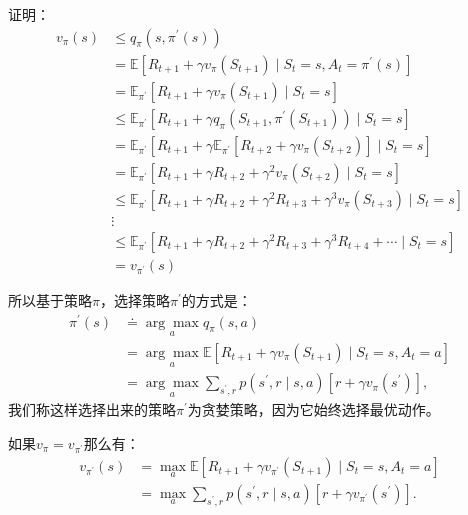 证明：
$$
\begin{aligned}
v_{\pi}(s) & \leq q_{\pi}\left(s, \pi^{\prime}(s)\right) \\
&=\mathbb{E}\left[R_{t+1}+\gamma v_{\pi}\left(S_{t+1}\right) \mid S_{t}=s, A_{t}=\pi^{\prime}(s)\right] \\
&=\mathbb{E}_{\pi^{\prime}}\left[R_{t+1}+\gamma v_{\pi}\left(S_{t+1}\right) \mid S_{t}=s\right] \\
& \leq \mathbb{E}_{\pi^{\prime}}\left[R_{t+1}+\gamma q_{\pi}\left(S_{t+1}, \pi^{\prime}\left(S_{t+1}\right)\right) \mid S_{t}=s\right] \\
&=\mathbb{E}_{\pi^{\prime}}\left[R_{t+1}+\gamma \mathbb{E}_{\pi^{\prime}}\left[R_{t+2}+\gamma v_{\pi}\left(S_{t+2}\right)\right] \mid S_{t}=s\right] \\
&=\mathbb{E}_{\pi^{\prime}}\left[R_{t+1}+\gamma R_{t+2}+\gamma^{2} v_{\pi}\left(S_{t+2}\right) \mid S_{t}=s\right] \\
& \leq \mathbb{E}_{\pi^{\prime}}\left[R_{t+1}+\gamma R_{t+2}+\gamma^{2} R_{t+3}+\gamma^{3} v_{\pi}\left(S_{t+3}\right) \mid S_{t}=s\right] \\
& \vdots \\
& \leq \mathbb{E}_{\pi^{\prime}}\left[R_{t+1}+\gamma R_{t+2}+\gamma^{2} R_{t+3}+\gamma^{3} R_{t+4}+\cdots \mid S_{t}=s\right] \\
&=v_{\pi^{\prime}}(s)
\end{aligned}
$$

所以基于策略$\pi$，选择策略$\pi^{\prime}$的方式是：
$$
\begin{aligned}
\pi^{\prime}(s) & \doteq \underset{a}{\arg \max } q_{\pi}(s, a) \\
&=\underset{a}{\arg \max } \mathbb{E}\left[R_{t+1}+\gamma v_{\pi}\left(S_{t+1}\right) \mid S_{t}=s, A_{t}=a\right] \\
&=\underset{a}{\arg \max } \sum_{s^{\prime}, r} p\left(s^{\prime}, r \mid s, a\right)\left[r+\gamma v_{\pi}\left(s^{\prime}\right)\right],
\end{aligned}
$$
我们称这样选择出来的策略$\pi^{\prime}$为贪婪策略，因为它始终选择最优动作。

如果$v_{\pi}=v_{\pi^{\prime}}$那么有：
$$
\begin{aligned}
v_{\pi^{\prime}}(s) &=\max _{a} \mathbb{E}\left[R_{t+1}+\gamma v_{\pi^{\prime}}\left(S_{t+1}\right) \mid S_{t}=s, A_{t}=a\right] \\
&=\max _{a} \sum_{s^{\prime}, r} p\left(s^{\prime}, r \mid s, a\right)\left[r+\gamma v_{\pi^{\prime}}\left(s^{\prime}\right)\right] .
\end{aligned}
$$

